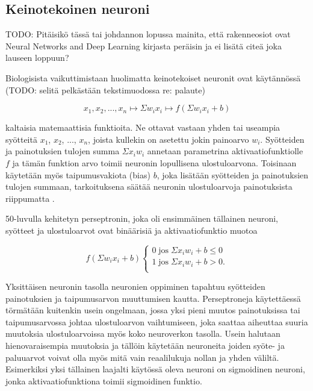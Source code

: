 \documentclass[finnish]{tktltiki2}
\theoremstyle{definition}
\theoremstyle{remark}
\begin{document}
  \subsection{Keinotekoinen neuroni}
    \label{chap:artificial-neuron}

    TODO: Pitäisikö tässä tai johdannon lopussa mainita, että rakenneosiot ovat Neural Networks and Deep Learning kirjasta \cite{Nielsen-neural} peräisin ja ei lisätä citeä joka lauseen loppuun? 

    Biologisista vaikuttimistaan huolimatta keinotekoiset neuronit ovat käytännössä (TODO: selitä pelkästään tekstimuodossa re: palaute)

     $$ x_1, x_2, ..., x_n \mapsto \Sigma w_i x_i \mapsto f(\Sigma w_i x_i + b) $$

    kaltaisia matemaattisia funktioita. Ne ottavat vastaan yhden tai useampia syötteitä $x_1$, $x_2$, ..., $x_n$, joista kullekin on asetettu jokin painoarvo $w_i$. Syötteiden ja painotuksien tulojen summa $\Sigma x_i w_i$ annetaan parametrina aktivaatiofunktiolle $f$ ja tämän funktion arvo toimii neuronin lopullisena ulostuloarvona. Toisinaan käytetään myös taipumusvakiota (bias) $b$, joka lisätään syötteiden ja painotuksien tulojen summaan, tarkoituksena säätää neuronin ulostuloarvoja painotuksista riippumatta \cite{Nielsen-neural}.

    50-luvulla kehitetyn perseptronin, joka oli ensimmäinen tällainen neuroni, syötteet ja ulostuloarvot ovat binäärisiä ja aktivaatiofunktio muotoa

    \begin{equation}
      f(\Sigma w_i x_i + b)
      \begin{cases}
        0\; \text{jos} \; \Sigma x_i w_i + b \leq 0 \\
        1\; \text{jos} \; \Sigma x_i w_i + b > 0. \\
      \end{cases}
      \label{eq:perceptron}
    \end{equation}

    Yksittäisen neuronin tasolla neuronien oppiminen tapahtuu syötteiden painotuksien ja taipumusarvon muuttumisen kautta. Perseptroneja käytettäessä törmätään kuitenkin usein ongelmaan, jossa yksi pieni muutos painotuksissa tai taipumusarvossa johtaa ulostuloarvon vaihtumiseen, joka saattaa aiheuttaa suuria muutoksia ulostuloarvoissa myös koko neuroverkon tasolla. Usein halutaan hienovaraisempia muutoksia ja tällöin käytetään neuroneita joiden syöte- ja paluuarvot voivat olla myös mitä vain reaalilukuja nollan ja yhden väliltä. Esimerkiksi yksi tällainen laajalti käytössä oleva neuroni on sigmoidinen neuroni, jonka aktivaatiofunktiona toimii sigmoidinen funktio.
\end{document}
